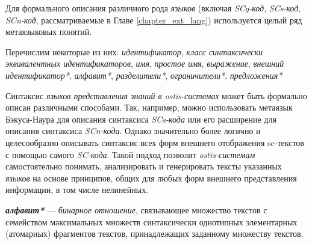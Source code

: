 \begin{SCn}


    \begin{scnindent}
    \end{scnindent}

\end{SCn}

Для формального описания различного рода \textit{языков} (включая \textit{SCg-код}, \textit{SCs-код}, \textit{SCn-код}, рассматриваемые в Главе \ref{chapter_ext_lang}) используется целый ряд метаязыковых понятий.

Перечислим некоторые из них: \textit{идентификатор}, \textit{класс синтаксически эквивалентных идентификаторов}, \textit{имя}, \textit{простое имя}, \textit{выражение}, \textit{внешний идентификатор*}, \textit{алфавит*}, \textit{разделители*}, \textit{ограничители*}, \textit{предложения*}

Синтаксис \textit{языков представления знаний в ostis-системах} может быть формально описан различными способами.
Так, например, можно использовать метаязык Бэкуса-Наура для описания синтаксиса \textit{SCs-кода} или его расширение для описания синтаксиса \textit{SCn-кода}.
Однако значительно более логично и целесообразно описывать синтаксис всех форм внешнего отображения sc-текстов с помощью самого \textit{SC-кода}.
Такой подход позволит \textit{ostis-системам} самостоятельно понимать, анализировать и генерировать тексты указанных \textit{языков} на основе принципов, общих для любых форм внешнего представления информации, в том числе нелинейных.

\textbf{\textit{алфавит*}} --- \textit{бинарное отношение}, связывающее множество текстов с  семейством максимальных множеств синтаксически однотипных элементарных (атомарных) фрагментов текстов, принадлежащих заданному множеству текстов.



